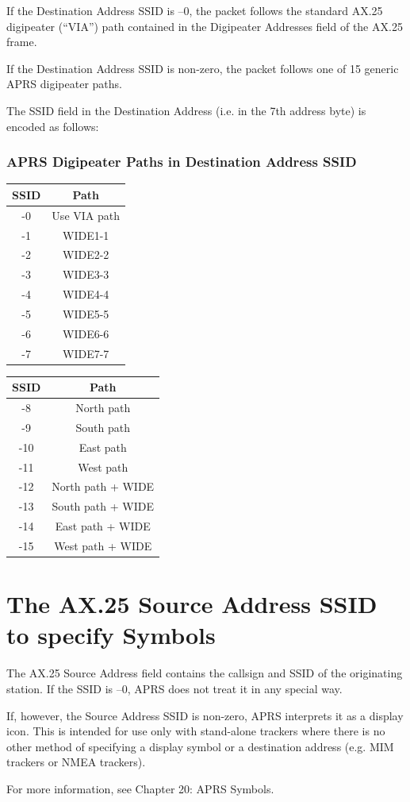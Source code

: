 If the Destination Address SSID is –0, the packet follows the standard AX.25
digipeater (“VIA”) path contained in the Digipeater Addresses field of the
AX.25 frame.

If the Destination Address SSID is non-zero, the packet follows one of 15
generic APRS digipeater paths.


The SSID field in the Destination Address (i.e. in the 7th address byte) is
encoded as follows:



\subsubsection*{APRS Digipeater Paths in Destination Address SSID}

  \begin{tabular}{|c|c|}
    \hline
    SSID & Path \\       \hline
    -0 & Use VIA path \\ \hline
    -1 & WIDE1-1 \\      \hline
    -2 & WIDE2-2 \\ \hline
    -3 & WIDE3-3 \\ \hline
    -4 & WIDE4-4 \\ \hline
    -5 & WIDE5-5 \\ \hline
    -6 & WIDE6-6 \\ \hline
    -7 & WIDE7-7 \\ \hline
  \end{tabular}
  
  \begin{tabular}{|c|c|}
    \hline
    SSID & Path \\       \hline
    -8 & North path \\ \hline
    -9 & South path \\      \hline
    -10 & East path \\ \hline
    -11 & West path \\ \hline
    -12 & North path + WIDE \\ \hline
    -13 & South path + WIDE \\ \hline
    -14 & East path + WIDE \\ \hline
    -15 & West path + WIDE \\ \hline
  \end{tabular}



\section{The AX.25 Source Address SSID to specify Symbols}

The AX.25 Source Address field contains the callsign and SSID of the
originating station. If the SSID is –0, APRS does not treat it in any special
way.

If, however, the Source Address SSID is non-zero, APRS interprets it as a
display icon. This is intended for use only with stand-alone trackers where
there is no other method of specifying a display symbol or a destination
address (e.g. MIM trackers or NMEA trackers).

For more information, see Chapter 20: APRS Symbols.
